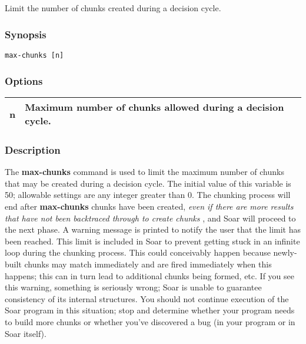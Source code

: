 \subsection{}
\label{max-chunks}
Limit the number of chunks created during a decision cycle. 
\subsubsection*{Synopsis}
\begin{verbatim}
max-chunks [n]
\end{verbatim}
\subsubsection*{Options}
\begin{tabular}{|l|l|}
\hline 
 n  & Maximum number of chunks allowed during a decision cycle.  \\
 \hline 
\end{tabular}
\subsubsection*{Description}
 The \textbf{max-chunks}
 command is used to limit the maximum number of chunks that may be created during a decision cycle. The initial value of this variable is 50; allowable settings are any integer greater than 0. 
 The chunking process will end after \textbf{max-chunks}
 chunks have been created, \emph{even if there are more results that have not been backtraced through to create chunks}
, and Soar will proceed to the next phase. A warning message is printed to notify the user that the limit has been reached. 
 This limit is included in Soar to prevent getting stuck in an infinite loop during the chunking process. This could conceivably happen because newly-built chunks may match immediately and are fired immediately when this happens; this can in turn lead to additional chunks being formed, etc. If you see this warning, something is seriously wrong; Soar is unable to guarantee consistency of its internal structures. You should not continue execution of the Soar program in this situation; stop and determine whether your program needs to build more chunks or whether you've discovered a bug (in your program or in Soar itself). 
